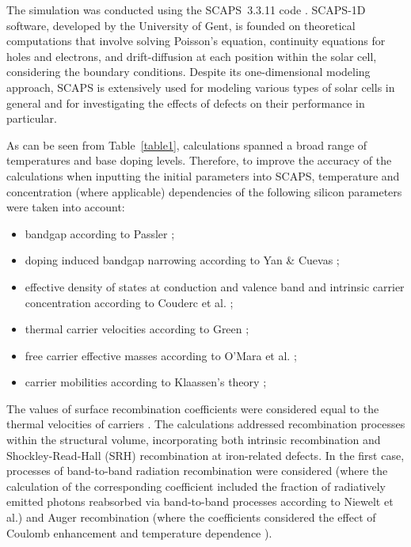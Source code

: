 \documentclass[a4paper,fleqn]{cas-sc}
\begin{document}
The simulation was conducted using the SCAPS~3.3.11 code \cite{SCAPS1}.
SCAPS-1D software, developed by the University of Gent, is founded on theoretical computations that involve solving Poisson's equation,
continuity equations for holes and electrons, and drift-diffusion at each position within the solar cell,
considering the boundary conditions.
Despite its one-dimensional modeling approach, SCAPS is extensively used for modeling various types 
of solar cells \cite{MasumMia2025,Rahman2024,Sultana2024,Joshi2024,Ravidas2024,Liu2024,You2023} in general
and for investigating the effects of defects on their performance \cite{MasumMia2025,Sultana2024,AitAbdelkadir2023,Liang2024,SCAPSDefect3} in particular.


As can be seen from Table~\ref{table1}, calculations spanned a broad range of temperatures and base doping levels.
Therefore, to improve the accuracy of the calculations when inputting the initial parameters into SCAPS,
temperature and concentration (where applicable) dependencies of the following silicon parameters were taken into account:

\begin{itemize}
    \item bandgap according to Passler \cite{Passler2002};
    \item doping induced bandgap narrowing according to Yan \& Cuevas \cite{EgNarrow};
    \item effective density of states at conduction and valence band and intrinsic carrier concentration according to Couderc et al. \cite{Si_ni_Couderc};
    \item thermal carrier velocities according to Green \cite{Nc:Green};
    \item free carrier effective masses according to O’Mara et al. \cite{OMara};
    \item carrier mobilities according to Klaassen's theory \cite{KLAASSEN953};
\end{itemize}

The values of surface recombination coefficients were considered equal to the thermal velocities of carriers \cite{Fell2015}.
The calculations addressed recombination processes within the structural volume,
incorporating both intrinsic recombination and Shockley-Read-Hall (SRH) recombination at iron-related defects.
In the first case, processes of band-to-band radiation recombination were considered
(where the calculation of the corresponding coefficient included the fraction of radiatively emitted photons
reabsorbed via band-to-band processes according to Niewelt et al.\cite{Brad2022})
and Auger recombination (where the coefficients considered the effect of Coulomb enhancement \cite{AugerSi2022} and temperature dependence \cite{Si_Auger}).
\end{document}
